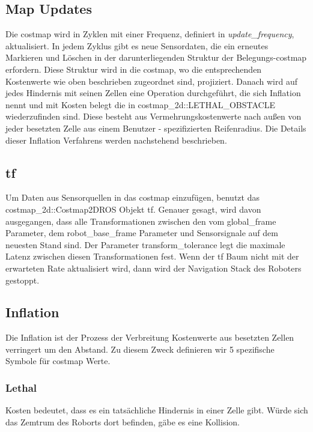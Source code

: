 \documentclass[oribibl]{llncs}
\begin{document}
\subsection{Map Updates}
Die costmap wird in Zyklen mit einer Frequenz, definiert in \textit{update\_frequency}, aktualisiert. In jedem Zyklus gibt es neue Sensordaten, die ein erneutes Markieren und Löschen in der darunterliegenden Struktur der Belegungs-costmap erfordern. Diese Struktur wird in die costmap, wo die entsprechenden Kostenwerte wie oben beschrieben zugeordnet sind, projiziert. Danach wird auf jedes Hindernis mit seinen Zellen eine Operation durchgeführt, die sich Inflation nennt und mit Kosten belegt die in costmap\_2d::LETHAL\_OBSTACLE wiederzufinden sind. Diese besteht aus Vermehrungskostenwerte nach außen von jeder besetzten Zelle aus einem Benutzer - spezifizierten Reifenradius. Die Details dieser Inflation Verfahrens werden nachstehend beschrieben.

\subsection{tf}
Um Daten aus Sensorquellen in das costmap einzufügen, benutzt das \\costmap\_2d::Costmap2DROS Objekt tf. Genauer gesagt, wird davon ausgegangen, dass alle Transformationen zwischen den vom global\_frame Parameter, dem robot\_base\_frame Parameter und Sensorsignale auf dem neuesten Stand sind. Der Parameter transform\_tolerance legt die maximale Latenz zwischen diesen Transformationen fest. Wenn der tf Baum nicht mit der erwarteten Rate aktualisiert wird, dann wird der Navigation Stack des Roboters gestoppt.

\subsection{Inflation}
Die Inflation ist der Prozess der Verbreitung Kostenwerte aus besetzten Zellen verringert um den Abstand. Zu diesem Zweck definieren wir 5 spezifische Symbole für costmap Werte.
\subsubsection{Lethal} Kosten bedeutet, dass es ein tatsächliche Hindernis in einer Zelle gibt.  Würde sich das Zemtrum des Roborts dort befinden, gäbe es eine Kollision.
\end{document}

